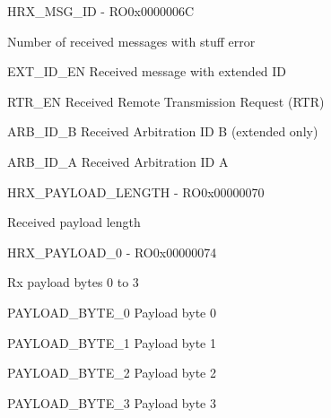 \documentclass{article}
\begin{document}
\begin{register}{H}{RX{\_}MSG{\_}ID - RO}{0x0000006C}  \par Number of received messages with stuff error \regnewline
  \label{RX_MSG_ID}
\regnewline
  \begin{regdesc}\begin{reglist}[EXT{\_}ID{\_}EN]
    \item [EXT{\_}ID{\_}EN] Received message with extended ID    \item [RTR{\_}EN] Received Remote Transmission Request (RTR)    \item [ARB{\_}ID{\_}B] Received Arbitration ID B (extended only)    \item [ARB{\_}ID{\_}A] Received Arbitration ID A  \end{reglist}\end{regdesc}
\end{register}

\begin{register}{H}{RX{\_}PAYLOAD{\_}LENGTH - RO}{0x00000070}  \par Received payload length \regnewline
  \label{RX_PAYLOAD_LENGTH}
\regnewline
\end{register}

\begin{register}{H}{RX{\_}PAYLOAD{\_}0 - RO}{0x00000074}  \par Rx payload bytes 0 to 3 \regnewline
  \label{RX_PAYLOAD_0}
\regnewline
  \begin{regdesc}\begin{reglist}
    \item [PAYLOAD{\_}BYTE{\_}0] Payload byte 0    \item [PAYLOAD{\_}BYTE{\_}1] Payload byte 1    \item [PAYLOAD{\_}BYTE{\_}2] Payload byte 2    \item [PAYLOAD{\_}BYTE{\_}3] Payload byte 3  \end{reglist}\end{regdesc}
\end{register}
\end{document}
